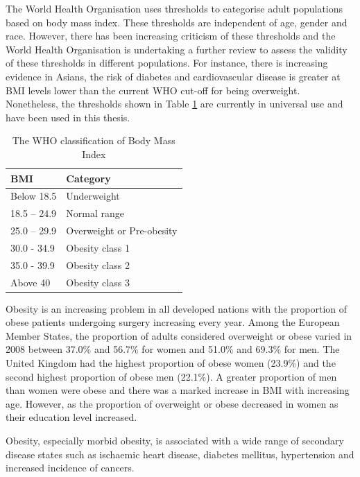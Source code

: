 The World Health Organisation uses thresholds to categorise adult populations based on body mass index. 
These thresholds are independent of age, gender and race. 
However, there has been increasing criticism of these thresholds and the World Health Organisation is undertaking a further review to assess the validity of these thresholds in different populations. 
For instance, there is increasing evidence in Asians, the risk of diabetes and cardiovascular disease is greater at BMI levels lower than the current WHO cut-off for being overweight. 
Nonetheless, the thresholds shown in Table \ref{table:bmi_who} are currently in universal use and have been used in this thesis.

\begin{table}[h]
	\centering
	\caption{The WHO classification of Body Mass Index}
	\label{table:bmi_who}
	\renewcommand{\arraystretch}{1.5} %
	\begin{tabular}{|l l|}
		\hline
		BMI     & Category         \\ \hline
		Below 18.5 & Underweight        \\
		18.5 – 24.9 & Normal range       \\
		25.0 – 29.9 & Overweight or Pre-obesity \\
		30.0 - 34.9 & Obesity class 1       \\
		35.0 - 39.9 & Obesity class 2       \\
		Above 40  & Obesity class 3       \\ \hline
	\end{tabular}
\end{table}

Obesity is an increasing problem in all developed nations with the proportion of obese patients undergoing surgery increasing every year. 
Among the European Member States, the proportion of adults considered overweight or obese varied in 2008 between 37.0\% and 56.7\% for women and 51.0\% and 69.3\% for men. 
The United Kingdom had the highest proportion of obese women (23.9\%) and the second highest proportion of obese men (22.1\%). 
A greater proportion of men than women were obese and there was a marked increase in BMI with increasing age. 
However, as the proportion of overweight or obese decreased in women as their education level increased. 

Obesity, especially morbid obesity, is associated with a wide range of secondary disease states such as ischaemic heart disease, diabetes mellitus, hypertension and increased incidence of cancers. 

